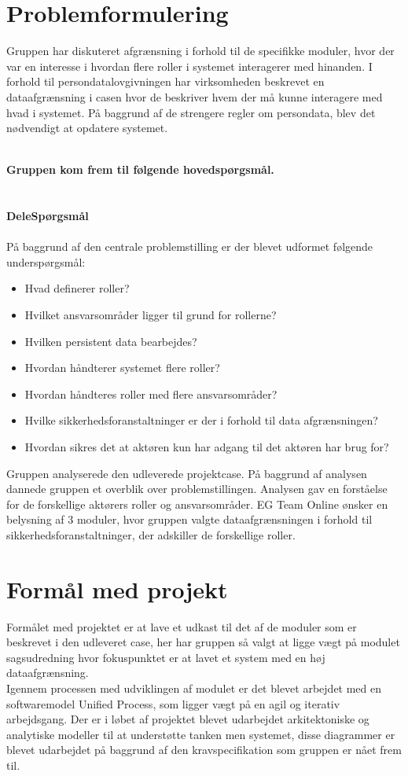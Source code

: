 \section{Problemformulering}

Gruppen har diskuteret afgrænsning i forhold til de specifikke moduler, hvor der var en interesse i hvordan flere roller i systemet interagerer med hinanden. I forhold til persondatalovgivningen har virksomheden beskrevet en dataafgrænsning i casen hvor de beskriver hvem der må kunne interagere med hvad i systemet. På baggrund af de strengere regler om persondata, blev det nødvendigt at opdatere systemet.

\textbf{\\Gruppen kom frem til følgende hovedspørgsmål.}\\ \\
\noindent{}
 \textbf{\\DeleSpørgsmål\\}\\
På baggrund af den centrale problemstilling er der blevet udformet følgende underspørgsmål:\\ 
\begin{itemize}
\item Hvad definerer roller?
\item Hvilket ansvarsområder ligger til grund for rollerne?
\item Hvilken persistent data bearbejdes?
\item Hvordan håndterer systemet flere roller?
\item Hvordan håndteres roller med flere ansvarsområder?
\item Hvilke sikkerhedsforanstaltninger er der i forhold til data afgrænsningen?
\item Hvordan sikres det at aktøren kun har adgang til det aktøren har brug for? 
\end{itemize}
Gruppen analyserede den udleverede projektcase. På baggrund af analysen dannede gruppen et overblik over problemstillingen. Analysen gav en forståelse for de forskellige aktørers roller og ansvarsområder. EG Team Online ønsker en belysning af 3 moduler, hvor gruppen valgte dataafgrænsningen i forhold til sikkerhedsforanstaltninger, der adskiller de forskellige roller.
\section{Formål med projekt}
Formålet med projektet er at lave et udkast til det af de moduler som er beskrevet i den udleveret case, her har gruppen så valgt at ligge vægt på modulet sagsudredning hvor fokuspunktet er at lavet et system med en høj dataafgrænsning.\\
Igennem processen med udviklingen af modulet er det blevet arbejdet med en softwaremodel Unified Process, som ligger vægt på en agil og iterativ arbejdsgang. Der er i løbet af projektet blevet udarbejdet arkitektoniske og analytiske modeller til at understøtte tanken men systemet, disse diagrammer er blevet udarbejdet på baggrund af den kravspecifikation som gruppen er nået frem til. 
